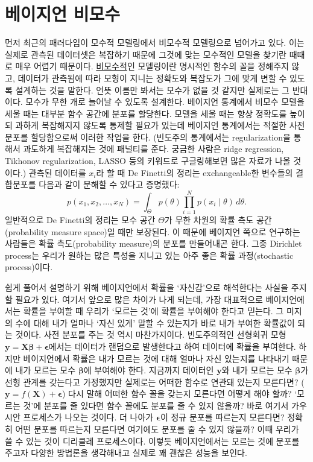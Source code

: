 \documentclass[a4paper, 10pt]{book}
\newcommand{\bs}{\boldsymbol}
\begin{document}
\section{베이지언 비모수}
  먼저 최근의 패러다임이 모수적 모델링에서 비모수적 모델링으로 넘어가고 있다. 이는 실제로 관측된 데이터셋은 복잡하기 때문에 그것에 맞는 모수적인 모델을 찾기란 때때로 매우 어렵기 때문이다. \underline{비모수적}인 모델링이란 명시적인 함수의 꼴을 정해주지 않고, 데이터가 관측됨에 따라 모형이 지니는 정확도와 복잡도가 그에 맞게 변할 수 있도록 설계하는 것을 말한다. 언뜻 이름만 봐서는 모수가 없을 것 같지만 실제로는 그 반대이다. 모수가 무한 개로 늘어날 수 있도록 설계한다. 베이지언 통계에서 비모수 모델을 세울 때는 대부분 함수 공간에 분포를 할당한다. 모델을 세울 때는 항상 정확도를 높이되 과하게 복잡해지지 않도록 통제할 필요가 있는데 베이지언 통계에서는 적절한 사전 분포를 할당함으로써 이러한 작업을 한다. (빈도주의 통계에서는 regularization을 통해서 과도하게 복잡해지는 것에 패널티를 준다. 궁금한 사람은 ridge regression, Tikhonov regularization, LASSO 등의 키워드로 구글링해보면 많은 자료가 나올 것이다.) 관측된 데이터를 $x_{i}$라 할 때 De Finetti의 정리는 exchangeable한 변수들의 결합분포를 다음과 같이 분해할 수 있다고 증명했다:
  $$
    p\left(x_{1},x_{2},\ldots,x_{N}\right) = \int_{\Theta}p\left(\theta\right)\prod_{i=1}^{N}p\left(x_{i}\middle|\theta\right)\,d\theta.
  $$
  일반적으로 De Finetti의 정리는 모수 공간 $\Theta$가 무한 차원의 확률 측도 공간(probability measure space)일 때만 보장된다. 이 때문에 베이지언 쪽으로 연구하는 사람들은 확률 측도(probability measure)의 분포를 만들어내곤 한다. 그중 Dirichlet process는 우리가 원하는 많은 특성을 지니고 있는 아주 좋은 확률 과정(stochastic process)이다. \par
  쉽게 풀어서 설명하기 위해 베이지언에서 확률을 `자신감'으로 해석한다는 사실을 주지할 필요가 있다. 여기서 앞으로 많은 차이가 나게 되는데, 가장 대표적으로 베이지언에서는 확률을 부여할 때 우리가 `모르는 것'에 확률을 부여해야 한다고 믿는다. 그 미지의 수에 대해 내가 얼마나 `자신 있게' 말할 수 있는지가 바로 내가 부여한 확률값이 되는 것이다. 사전 분포를 주는 것 역시 마찬가지이다. 빈도주의적인 선형회귀 모형 $\bs{y} = \bs{X\beta} + \bs{\epsilon}$에서는 데이터가 랜덤으로 발생한다고 하여 데이터에 확률을 부여한다. 하지만 베이지언에서 확률은 내가 모르는 것에 대해 얼마나 자신 있는지를 나타내기 때문에 내가 모르는 모수 $\bs{\beta}$에 부여해야 한다. 지금까지 데이터인 $\bs{y}$와 내가 모르는 모수 $\bs{\beta}$가 선형 관계를 갖는다고 가정했지만 실제로는 어떠한 함수로 연관돼 있는지 모른다면? ($\bs{y}=f\left(\bs{X}\right) +\bs{\epsilon}$)  다시 말해 어떠한 함수 꼴을 갖는지 모른다면 어떻게 해야 할까? `모르는 것'에 분포를 줄 있다면 함수 꼴에도 분포를 줄 수 있지 않을까? 바로 여기서 가우시안 프로세스가 나오는 것이다. 더 나아가 $\bs{\epsilon}$이 정규 분포를 따르는지 모른다면? 정확히 어떤 분포를 따르는지 모른다면 여기에도 분포를 줄 수 있지 않을까? 이때 우리가 쓸 수 있는 것이 디리클레 프로세스이다. 이렇듯 베이지언에서는 모르는 것에 분포를 주고자 다양한 방법론을 생각해내고 실제로 꽤 괜찮은 성능을 보인다. \par
\end{document}
